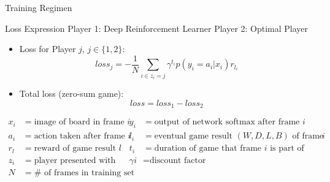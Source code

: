 \documentclass[11pt]{beamer}
\begin{document}
\begin{frame}{Training Regimen}
\end{frame}

\begin{frame}[shrink=15]{Loss Expression}
	Player 1: Deep Reinforcement Learner \qquad \qquad Player 2: Optimal Player \\
	\vspace{5 mm}
	\begin{itemize}
		\item Loss for Player $j$, $j \in \{1,2\}$:
		\begin{equation}
		loss_j = -\frac{1}{N} \sum_{i \in z_i=j} \gamma^{t_i} p(y_i=a_i|x_i) r_{l_i} 
		\end{equation}
		\item Total loss (zero-sum game):
		\begin{equation}
		loss = loss_1 - loss_2
		\end{equation}
	\end{itemize}
	
	\begin{align*}
		x_i &= \text{image of board in frame } i & y_i &= \text{output of network softmax after frame } i \\
		a_i &= \text{action taken after frame } i  & l_i &= \text{eventual game result $(W,D,L,B)$ of frame } i \\
		r_l &= \text{reward of game result } l & t_i &= \text{duration of game that frame } i \text{ is part of} \\
		z_i &= \text{player presented with frame } i & \gamma &= \text{discount factor} \\
		N &= \#\text{ of frames in training set}
	\end{align*}	
\end{frame}
\end{document}
